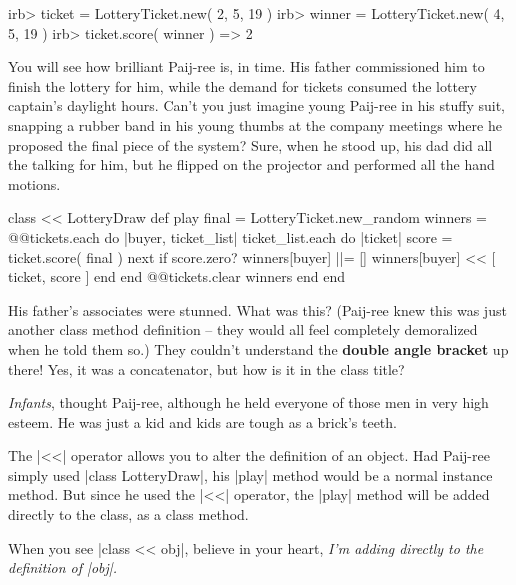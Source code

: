 \documentclass[12pt,twoside]{report}
\begin{document}
\begin{consolecode}

 irb> ticket = LotteryTicket.new( 2, 5, 19 )
 irb> winner = LotteryTicket.new( 4, 5, 19 )
 irb> ticket.score( winner )
   => 2

\end{consolecode}


You will see how brilliant Paij-ree is, in time.  His father
commissioned him to finish the lottery for him, while the demand for
tickets consumed the lottery captain's daylight hours.  Can't you just
imagine young Paij-ree in his stuffy suit, snapping a rubber band in
his young thumbs at the company meetings where he proposed the final
piece of the system?  Sure, when he stood up, his dad did all the
talking for him, but he flipped on the projector and performed all the
hand motions.


\begin{rubycode}

 class << LotteryDraw
   def play
     final = LotteryTicket.new_random
     winners = {}
     @@tickets.each do |buyer, ticket_list|
       ticket_list.each do |ticket|
         score = ticket.score( final )
         next if score.zero?
         winners[buyer] ||= []
         winners[buyer] << [ ticket, score ]
       end
     end
     @@tickets.clear
     winners
   end
 end

\end{rubycode}


His father's associates were stunned.  What was this?  (Paij-ree knew
this was just another class method definition -- they would all feel
completely demoralized when he told them so.)  They couldn't
understand the {\bf double angle bracket} up there!  Yes, it was a
concatenator, but how is it in the class title?

{\em Infants}, thought Paij-ree, although he held everyone of those
men in very high esteem.  He was just a kid and kids are tough as a
brick's teeth.

The \rubyinline|<<| operator allows you to alter the
definition of an object. Had Paij-ree simply used
\rubyinline|class LotteryDraw|, his
\rubyinline|play| method would be a normal instance
method.  But since he used the \rubyinline|<<|
operator, the \rubyinline|play| method will be added
directly to the class, as a class method.

When you see \rubyinline|class << obj|, believe in
your heart, {\em I'm adding directly to the definition of
  \rubyinline|obj|.}
\end{document}
